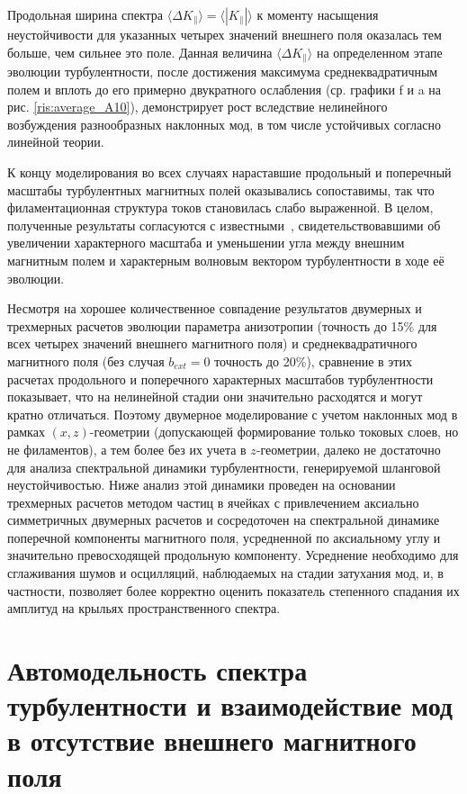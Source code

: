 Продольная ширина спектра $\langle \Delta K_\|\rangle=\langle  |K_\||\rangle$ к моменту насыщения неустойчивости для указанных четырех значений внешнего поля оказалась тем больше, чем сильнее это поле.
Данная величина $\langle \Delta K_\|\rangle$ на определенном этапе эволюции турбулентности, после достижения максимума среднеквадратичным полем и вплоть до его примерно двукратного ослабления (ср. графики f и a на рис. \ref{ris:average_A10}), демонстрирует рост вследствие нелинейного возбуждения разнообразных наклонных мод, в том числе устойчивых согласно линейной теории. 

К концу моделирования во всех случаях нараставшие продольный и поперечный масштабы турбулентных магнитных полей оказывались сопоставимы, так что филаментационная структура токов становилась слабо выраженной. В целом, полученные результаты согласуются с известными~\cite{Camporeale2008,Hellinger2014}, свидетельствовавшими об увеличении характерного масштаба и уменьшении угла между внешним магнитным полем и характерным волновым вектором турбулентности в ходе её эволюции.

Несмотря на хорошее количественное совпадение результатов двумерных и трехмерных расчетов эволюции параметра анизотропии (точность до 15\% для всех четырех значений внешнего магнитного поля) и среднеквадратичного магнитного поля (без случая $b_{ext}=0$ точность до 20\%), сравнение в этих расчетах продольного и поперечного характерных масштабов турбулентности показывает, что на нелинейной стадии они значительно расходятся и могут кратно отличаться. Поэтому двумерное моделирование с учетом наклонных мод в рамках $(x,z)$-геометрии (допускающей формирование только токовых слоев, но не филаментов), а тем более без их учета в $z$-геометрии, далеко не достаточно для анализа спектральной динамики турбулентности, генерируемой шланговой неустойчивостью. Ниже анализ этой динамики проведен на основании трехмерных расчетов методом частиц в ячейках с привлечением аксиально симметричных двумерных расчетов и сосредоточен на спектральной динамике поперечной компоненты магнитного поля, усредненной по аксиальному углу и значительно превосходящей продольную компоненту. Усреднение необходимо для сглаживания шумов и осцилляций, наблюдаемых на стадии затухания мод, и, в частности, позволяет более корректно оценить показатель степенного спадания их амплитуд на крыльях пространственного спектра.


\section{Автомодельность спектра турбулентности и взаимодействие мод в отсутствие внешнего магнитного поля}
\label{ch:ch4/sec7}


